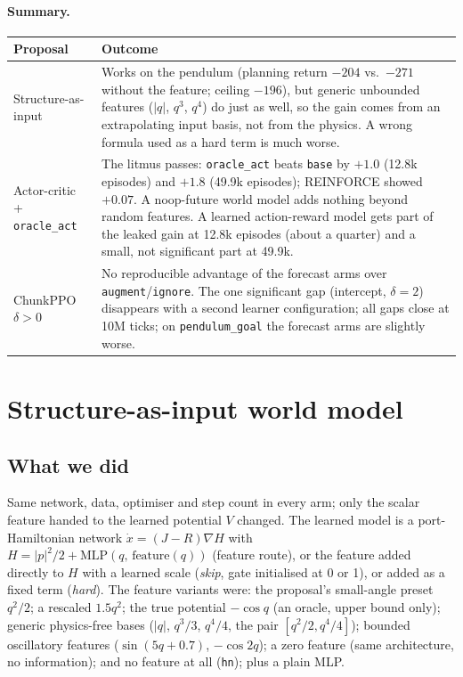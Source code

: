 \documentclass[11pt]{article}
\begin{document}
\paragraph{Summary.}
\begin{center}
\footnotesize
\begin{tabular}{@{}p{2.6cm}p{12.4cm}@{}}
\toprule
Proposal & Outcome \\
\midrule
Structure-as-input & Works on the pendulum (planning return $-204$ vs.\ $-271$ without the feature; ceiling $-196$), but generic unbounded features ($|q|$, $q^3$, $q^4$) do just as well, so the gain comes from an extrapolating input basis, not from the physics. A wrong formula used as a hard term is much worse. \\
Actor-critic + \texttt{oracle\_act} & The litmus passes: \texttt{oracle\_act} beats \texttt{base} by $+1.0$ (12.8k episodes) and $+1.8$ (49.9k episodes); REINFORCE showed $+0.07$. A noop-future world model adds nothing beyond random features. A learned action-reward model gets part of the leaked gain at 12.8k episodes (about a quarter) and a small, not significant part at 49.9k. \\
ChunkPPO $\delta>0$ & No reproducible advantage of the forecast arms over \texttt{augment}/\texttt{ignore}. The one significant gap (intercept, $\delta=2$) disappears with a second learner configuration; all gaps close at 10M ticks; on \texttt{pendulum\_goal} the forecast arms are slightly worse. \\
\bottomrule
\end{tabular}
\end{center}

\section{Structure-as-input world model}

\subsection{What we did}
Same network, data, optimiser and step count in every arm; only the scalar feature handed to the learned potential $V$ changed.
The learned model is a port-Hamiltonian network $\dot x=(J-R)\nabla H$ with $H=|p|^2/2+\mathrm{MLP}(q,\,\text{feature}(q))$ (feature route), or the feature added
directly to $H$ with a learned scale (\emph{skip}, gate initialised at 0 or 1), or added as a fixed term (\emph{hard}). The feature variants were:
the proposal's small-angle preset $q^2/2$; a rescaled $1.5q^2$; the true potential $-\cos q$ (an oracle, upper bound only); generic physics-free bases ($|q|$, $q^3/3$, $q^4/4$, the pair $[q^2/2,q^4/4]$);
bounded oscillatory features ($\sin(5q+0.7)$, $-\cos 2q$); a zero feature (same architecture, no information); and no feature at all (\texttt{hn}); plus a plain MLP.
\end{document}
